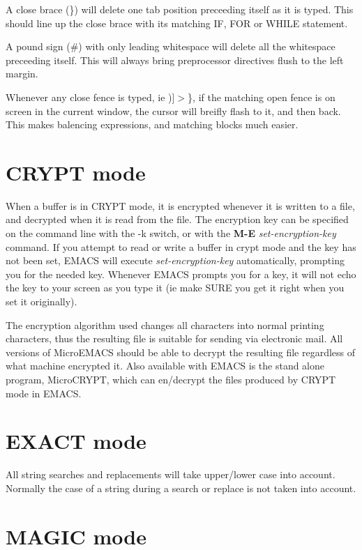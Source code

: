 A close brace (\}) will delete one tab position preceeding itself
as it is typed.  This should line up the close brace with its matching
IF, FOR or WHILE statement.

A pound sign (\#) with only leading whitespace will delete all
the whitespace preceeding itself. This will always bring preprocessor
directives flush to the left margin.

Whenever any close fence is typed, ie )]$>${}\}, if the matching open
fence is on screen in the current window, the cursor will breifly flash
to it, and then back. This makes balencing expressions, and matching
blocks much easier.

\section{CRYPT mode}

When a buffer is in CRYPT mode,  it is
encrypted whenever it is written to a file, and decrypted when it is
read from the file.  The encryption key can be specified on the command
line with the -k switch, or with the {\bf{}M-E} {\it{}set-encryption-key}
 command.  If you attempt to read or write a
buffer in crypt mode and the key has not been set, EMACS will execute
{\it{}set-encryption-key} automatically, prompting you for the needed key.
Whenever EMACS prompts you for a key, it will not echo the key to your
screen as you type it (ie make SURE you get it right when you set it
originally).

The encryption algorithm used changes all characters into normal
printing characters, thus the resulting file is suitable for sending via
electronic mail.  All versions of MicroEMACS should be able to decrypt the
resulting file regardless of what machine encrypted it.  Also available
with EMACS is the stand alone program, MicroCRYPT, which can en/decrypt
the files produced by CRYPT mode in EMACS.

\section{EXACT mode}

All string searches and replacements will take upper/lower case
into account. Normally the case of a string during a search or replace
is not taken into account.

\section{MAGIC mode}

